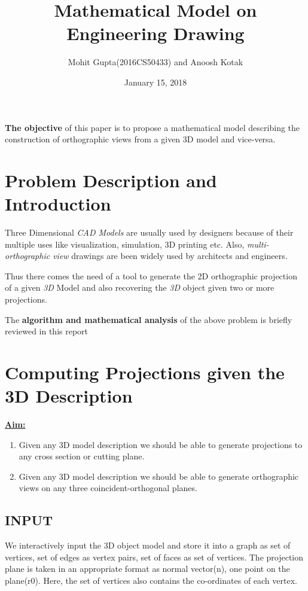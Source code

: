 \documentclass[12pt]{article}
\title{Mathematical Model on Engineering Drawing}
\author{Mohit Gupta(2016CS50433) and Anoosh Kotak }
\date{January 15, 2018}
\begin{document}
\maketitle



\textbf{The objective} of this paper is to propose a mathematical model describing the construction of orthographic views from a given 3D model and vice-versa.



\section{Problem Description and Introduction}

Three Dimensional \emph{CAD Models} are usually used by designers because of their multiple uses like visualization, simulation, 3D printing etc. Also, \emph{multi-orthographic view} drawings are been widely used by architects and engineers.

\bigskip

Thus there comes the need of a tool to generate the 2D orthographic projection of a given \emph{3D} Model and also recovering the \emph{3D} object given two or more projections.

The \textbf{algorithm and mathematical analysis} of the above problem is briefly reviewed in this report

\section{Computing Projections given the 3D Description}

\textbf{\underline{Aim:}} 

\begin{enumerate}
    \item Given any 3D model description we should be able to generate projections to any cross section or cutting plane.
    \item Given any 3D model description we should be able to generate orthographic views on any three coincident-orthogonal planes.
\end{enumerate}

\subsection{INPUT}
We interactively input the 3D object model and store it into a graph as {set of vertices, set of edges as vertex pairs, set of faces as set of vertices}. The projection plane is taken in an appropriate format as {normal vector(n), one point on the plane(r0)}. Here, the set of vertices also contains the co-ordinates of each vertex.
\end{document}
